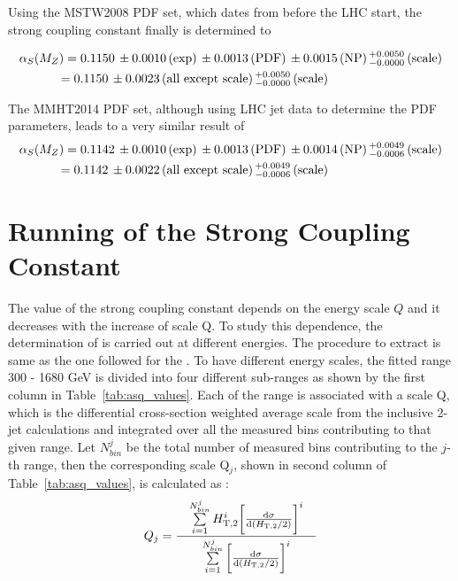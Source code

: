 Using the MSTW2008 PDF set, which dates from before the LHC start, the strong coupling constant finally is determined to

\begin{equation}
\begin{gathered}
  \alpsmz = 0.1150\,\pm0.0010\,\textrm{(exp)}\,\pm0.0013\,\textrm{(PDF)}\,\pm0.0015\,\textrm{(NP)}\,^{+0.0050}_{-0.0000}\,\textrm{(scale)}\\
  \hspace*{-20mm} = 0.1150\,\pm0.0023\,\textrm{(all except scale)}\,^{+0.0050}_{-0.0000}\,\textrm{(scale)}\,
\end{gathered}
\end{equation}

The MMHT2014 PDF set, although using LHC jet data to determine the PDF parameters, leads to a very similar result of
\begin{equation}
\begin{gathered}
  \alpsmz = 0.1142\,\pm0.0010\,\textrm{(exp)}\,\pm0.0013\,\textrm{(PDF)}\,\pm0.0014\,\textrm{(NP)}\,^{+0.0049}_{-0.0006}\,\textrm{(scale)}\\
  \hspace*{-20mm} = 0.1142\,\pm0.0022\,\textrm{(all except scale)}\,^{+0.0049}_{-0.0006}\,\textrm{(scale)}\,
\end{gathered}
\end{equation}

\section{Running of the Strong Coupling Constant}
The value of the strong coupling constant \alps depends on the energy scale $Q$ and it decreases with the increase of scale Q. To study this dependence, the determination of \alps is carried out at different energies. The procedure to extract \alpsq is same as the one followed for the \alpsmz. To have different energy scales, the fitted \httwo range 300 - 1680 GeV is divided into four different sub-ranges as shown by the first column in Table~\ref{tab:asq_values}. Each of the \httwo range is associated with a scale Q, which is the differential cross-section weighted average \httwo scale from the inclusive 2-jet calculations and integrated over all the measured \httwo bins contributing to that given \httwo range. Let $N^{j}_{bin}$ be the total number of measured \httwo bins contributing to the $j$-th \httwo range, then the corresponding scale Q$_{j}$, shown in second column of Table~\ref{tab:asq_values}, is calculated as :
\begin{equation}
Q_{j} = \frac[10pt]{\sum\limits_{i=1}^{N^{j}_{bin}} H^{i}_{\rm T,2} \bigg[{\dd{\sigma}{(\httwo)}}\bigg]^{i}}{\sum\limits_{i=1}^{N^{j}_{bin}} \bigg[{\dd{\sigma}{(\httwo)}}\bigg]^{i}}
\end{equation}

